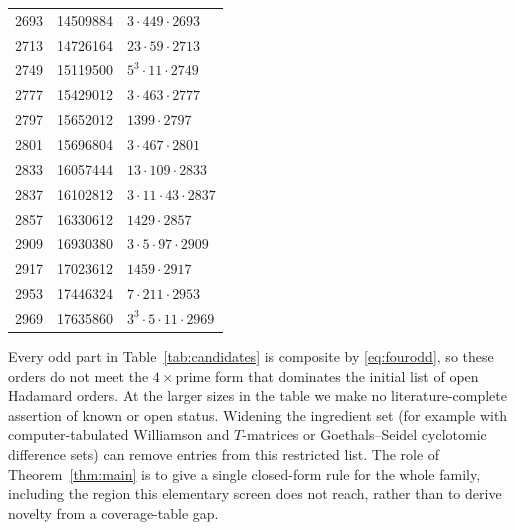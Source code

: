 \documentclass[11pt]{article}
\begin{document}
{\begin{longtable}{r r l}
2693 & 14509884 & \(3\cdot449\cdot2693\) \\
2713 & 14726164 & \(23\cdot59\cdot2713\) \\
2749 & 15119500 & \(5^{3}\cdot11\cdot2749\) \\
2777 & 15429012 & \(3\cdot463\cdot2777\) \\
2797 & 15652012 & \(1399\cdot2797\) \\
2801 & 15696804 & \(3\cdot467\cdot2801\) \\
2833 & 16057444 & \(13\cdot109\cdot2833\) \\
2837 & 16102812 & \(3\cdot11\cdot43\cdot2837\) \\
2857 & 16330612 & \(1429\cdot2857\) \\
2909 & 16930380 & \(3\cdot5\cdot97\cdot2909\) \\
2917 & 17023612 & \(1459\cdot2917\) \\
2953 & 17446324 & \(7\cdot211\cdot2953\) \\
2969 & 17635860 & \(3^{3}\cdot5\cdot11\cdot2969\) \\
\end{longtable}
}

\noindent
Every odd part in Table~\ref{tab:candidates} is composite by
\eqref{eq:fourodd}, so these orders do not meet the
\(4\times\text{prime}\) form that dominates the initial list of open
Hadamard orders.  At the larger sizes in the table we make no
literature-complete assertion of known or open status.  Widening the
ingredient set (for example with computer-tabulated Williamson and
\(T\)-matrices or Goethals--Seidel cyclotomic difference sets) can remove
entries from this restricted list.  The role of
Theorem~\ref{thm:main} is to give a single closed-form rule for the whole
family, including the region this elementary screen does not reach,
rather than to derive novelty from a coverage-table gap.
\end{document}
